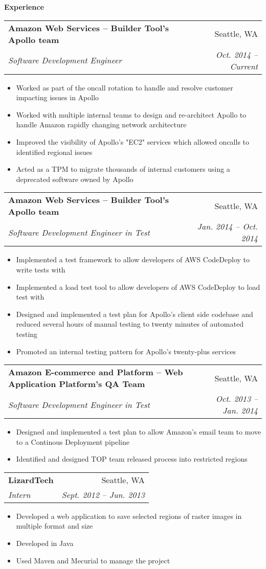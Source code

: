 \documentclass[letterpaper,11pt]{article}
\makeatletter
\newcommand{\resitem}[1]{\item #1 \vspace{-2pt}}
\newcommand{\resheading}[1]{{\large \colorbox{mygrey}{\begin{minipage}{\textwidth}{\textbf{#1 \vphantom{p\^{E}}}}\end{minipage}}}}
\newcommand{\ressubheading}[4]{
\begin{tabular*}{6.5in}{l@{\extracolsep{\fill}}r}
		\textbf{#1} & #2 \\
		\textit{#3} & \textit{#4} \\
\end{tabular*}\vspace{-6pt}}
\makeatother
\begin{document}
\resheading{Experience}
	\begin{description}
		 {\footnotesize 
			\item \ressubheading{{Amazon Web Services -- Builder Tool's Apollo team }}{Seattle, WA}{Software Development Engineer}{Oct. 2014 -- Current}
				\begin{itemize}
					\resitem{Worked as part of the oncall rotation to handle and resolve customer impacting issues in Apollo}
					\resitem{Worked with multiple internal teams to design and re-architect Apollo to handle Amazon rapidly changing network architecture  }					
					\resitem{Improved the visibility of Apollo's "EC2" services which allowed oncalls to identified regional issues }
					\resitem{Acted as a TPM to migrate thousands of internal customers using a deprecated software owned by Apollo }
				\end{itemize}
			\item \ressubheading{{Amazon Web Services -- Builder Tool's Apollo team }}{Seattle, WA}{Software Development Engineer in Test}{Jan. 2014 -- Oct. 2014}
				\begin{itemize}
					\resitem{Implemented a test framework to allow developers of AWS CodeDeploy to write tests with}
					\resitem{Implemented a load test tool to allow developers of AWS CodeDeploy to load test with}
					\resitem{Designed and implemented a test plan for Apollo's client side codebase and reduced several hours of manual testing to twenty minutes of automated testing}
					\resitem{Promoted an internal testing pattern for Apollo's twenty-plus services}
				\end{itemize}
			\item \ressubheading{{Amazon E-commerce and Platform -- Web Application Platform's QA Team}}{Seattle, WA}{Software Development Engineer in Test}{Oct. 2013 -- Jan. 2014}
				\begin{itemize}
					\resitem{Designed and implemented a test plan to allow Amazon's email team to move to a Continous Deployment pipeline }
					\resitem{Identified and designed TOP team released process into restricted regions}
				\end{itemize}
			\item \ressubheading{{LizardTech }}{Seattle, WA}{Intern}{Sept. 2012 -- Jun. 2013}
				\begin{itemize}
					\resitem{Developed a web application to save selected regions of raster images in multiple format and size}
					\resitem{Developed in Java}
					\resitem{Used Maven and Mecurial to manage the project}
				\end{itemize}
			}



	\end{description} %
	
\end{document}
